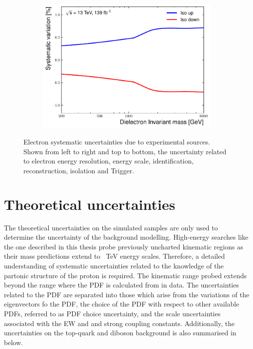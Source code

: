\begin{figure}[]
\begin{subfigure}[b]{0.42\textwidth}
        \includegraphics[width=\textwidth]{figures/analysis/datamc/Uncertainties/exp/ee/m_ee_pstOR_EL_EFF_Iso_TOTAL_1NPCOR_PLUS_UNCOR__1up.pdf}
        \label{fig:uncert:eeIso}
    \end{subfigure}
    \caption[Electron systematic uncertainties due to experimental sources]{Electron systematic uncertainties due to experimental sources. Shown from left to right and top to bottom, the uncertainty related to electron energy resolution, energy scale, identification, reconstruction, isolation and Trigger.}
    \label{fig:uncert:eeExp}
\end{figure}

\section{Theoretical uncertainties}\label{sec:sysmc:theory}
The theoretical uncertainties on the simulated samples are only used to determine the uncertainty of the background modelling. High-energy searches like the one described in this thesis probe previously uncharted kinematic regions as their mass predictions extend to \SI{}{\tera\electronvolt} energy scales. Therefore, a detailed understanding of systematic uncertainties related to the knowledge of the partonic structure of the proton is required. The kinematic range probed extends beyond the range where the PDF is calculated from in data. The uncertainties related to the PDF are separated into those which arise from the variations of the eigenvectors fo the PDF, the choice of the PDF with respect to other available PDFs, referred to as PDF choice uncertainty, and the scale uncertainties associated with the EW and and strong coupling constants. Additionally, the uncertainties on the top-quark and diboson background is also summarised in below. 

